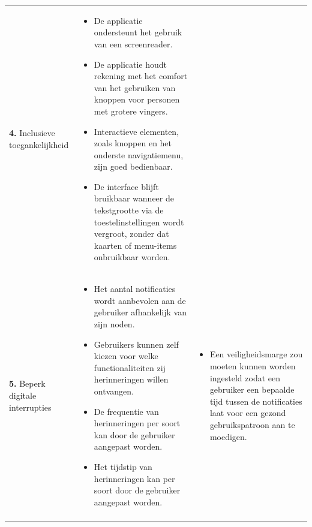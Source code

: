 {\begin{longtable}{
            >{\raggedright\arraybackslash}p{5.23cm}
            >{\raggedright\arraybackslash}p{4.93cm}
            >{\raggedright\arraybackslash}p{4.93cm}
        }
        \textbf{4.} Inclusieve toegankelijkheid 
        &  
        \begin{itemize}[nosep,leftmargin=*,itemsep=10pt] 
            \renewcommand{\labelitemi}{+} 
            \item De applicatie ondersteunt het gebruik van een screenreader.
            \item De applicatie houdt rekening met het comfort van het gebruiken van knoppen voor personen met grotere vingers.
            \item Interactieve elementen, zoals knoppen en het onderste navigatiemenu, zijn goed bedienbaar.
            \item De interface blijft bruikbaar wanneer de tekstgrootte via de toestelinstellingen wordt vergroot, zonder dat kaarten of menu-items onbruikbaar worden.
        \end{itemize} 
        &
        \\
        
        \addlinespace[5pt]
        
        \textbf{5.} Beperk digitale interrupties
        & 
        \begin{itemize}[nosep,leftmargin=*,itemsep=10pt]
            \renewcommand{\labelitemi}{+}
            \item Het aantal notificaties wordt aanbevolen aan de gebruiker afhankelijk van zijn noden.
            \item Gebruikers kunnen zelf kiezen voor welke functionaliteiten zij herinneringen willen ontvangen.
            \item De frequentie van herinneringen per soort kan door de gebruiker aangepast worden.
            \item Het tijdstip van herinneringen kan per soort door de gebruiker aangepast worden.
        \end{itemize}
        & 
        \begin{itemize}[nosep,leftmargin=*,itemsep=10pt]
            \renewcommand{\labelitemi}{-}
            \item Een veiligheidsmarge zou moeten kunnen worden ingesteld zodat een gebruiker een bepaalde tijd tussen de notificaties laat voor een gezond gebruikspatroon aan te moedigen.
        \end{itemize}
        \\
        
        \addlinespace[5pt]
        

\end{longtable}}
